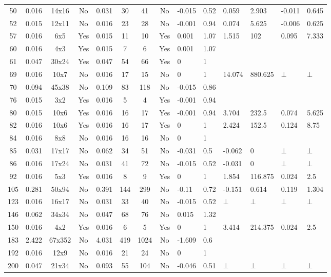 \documentclass[11pt]{article}
\begin{document}
\begin{landscape}
\begin{small}
\begin{longtable}[c]{| c | c | c | c |c |c |c |c |p{1.5cm} |p{1.5cm} |p{1.5cm} |p{1.5cm} |p{1.5cm} |p{1.5cm} |}
50 & 0.016 & 14x16 & No & 0.031 & 30 & 41 & No & -0.015 & 0.52 & 0.059 & 2.903 & -0.011 & 0.645\\
52 & 0.015 & 12x11 & No & 0.016 & 23 & 28 & No & -0.001 & 0.94 & 0.074 & 5.625 & -0.006 & 0.625\\
57 & 0.016 & 6x5 & Yes & 0.015 & 11 & 10 & Yes & 0.001 & 1.07 & 1.515 & 102 & 0.095 & 7.333\\
60 & 0.016 & 4x3 & Yes & 0.015 & 7 & 6 & Yes & 0.001 & 1.07 &  &  &  & \\
61 & 0.047 & 30x24 & Yes & 0.047 & 54 & 66 & Yes & 0 & 1 &  &  &  & \\
69 & 0.016 & 10x7 & No & 0.016 & 17 & 15 & No & 0 & 1 & 14.074 & 880.625 & $\bot$ & $\bot$\\
70 & 0.094 & 45x38 & No & 0.109 & 83 & 118 & No & -0.015 & 0.86 &  &  &  & \\
76 & 0.015 & 3x2 & Yes & 0.016 & 5 & 4 & Yes & -0.001 & 0.94 &  &  &  & \\
80 & 0.015 & 10x6 & Yes & 0.016 & 16 & 17 & Yes & -0.001 & 0.94 & 3.704 & 232.5 & 0.074 & 5.625\\
82 & 0.016 & 10x6 & Yes & 0.016 & 16 & 17 & Yes & 0 & 1 & 2.424 & 152.5 & 0.124 & 8.75\\
84 & 0.016 & 8x8 & No & 0.016 & 16 & 16 & No & 0 & 1 &  &  &  & \\
85 & 0.031 & 17x17 & No & 0.062 & 34 & 51 & No & -0.031 & 0.5 & -0.062 & 0 & $\bot$ & $\bot$\\
86 & 0.016 & 17x24 & No & 0.031 & 41 & 72 & No & -0.015 & 0.52 & -0.031 & 0 & $\bot$ & $\bot$\\
92 & 0.016 & 5x3 & Yes & 0.016 & 8 & 9 & Yes & 0 & 1 & 1.854 & 116.875 & 0.024 & 2.5\\
105 & 0.281 & 50x94 & No & 0.391 & 144 & 299 & No & -0.11 & 0.72 & -0.151 & 0.614 & 0.119 & 1.304\\
123 & 0.016 & 16x17 & No & 0.031 & 33 & 40 & No & -0.015 & 0.52 & $\bot$ & $\bot$ & $\bot$ & $\bot$\\
146 & 0.062 & 34x34 & No & 0.047 & 68 & 76 & No & 0.015 & 1.32 &  &  &  & \\
150 & 0.016 & 4x2 & Yes & 0.016 & 6 & 5 & Yes & 0 & 1 & 3.414 & 214.375 & 0.024 & 2.5\\
183 & 2.422 & 67x352 & No & 4.031 & 419 & 1024 & No & -1.609 & 0.6 &  &  &  & \\
192 & 0.016 & 12x9 & No & 0.016 & 21 & 24 & No & 0 & 1 &  &  &  & \\
200 & 0.047 & 21x34 & No & 0.093 & 55 & 104 & No & -0.046 & 0.51 & $\bot$ & $\bot$ & $\bot$ & $\bot$\\

\end{longtable}
\end{small}
\end{landscape}
\end{document}
